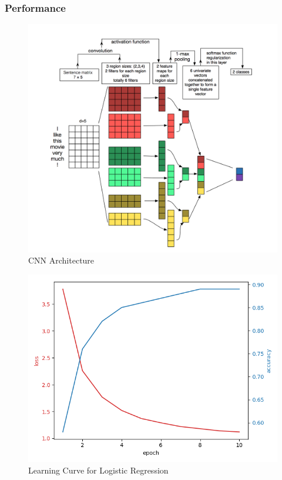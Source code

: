 \documentclass{sig-alternate-05-2015}
\begin{document}
\subsubsection{Performance}
\begin{figure}[H]
\centering
\includegraphics[width=\linewidth]{plots/multi-channel-CNN-architecture.png}
\caption{CNN Architecture}
\end{figure}

\begin{figure}[H]
\centering
\includegraphics[width=\linewidth]{plots/learning_curve_cnn.png}
\caption{Learning Curve for Logistic Regression}
\end{figure}
\end{document}
